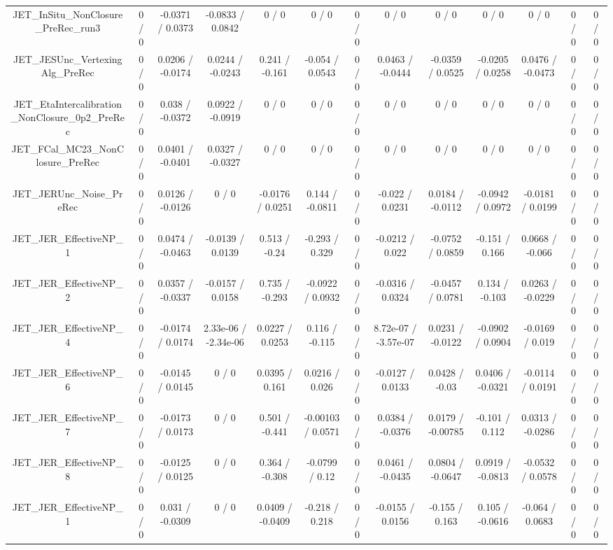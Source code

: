 \documentclass[10pt]{article}
\begin{document}
\begin{table}[htbp]
\begin{center}
\begin{tabular}{|c|c|c|c|c|c|c|c|c|c|c|c|c|}
  JET_InSitu_NonClosure_PreRec_run3 & 0 / 0 & -0.0371 / 0.0373 & -0.0833 / 0.0842 & 0 / 0 & 0 / 0 & 0 / 0 & 0 / 0 & 0 / 0 & 0 / 0 & 0 / 0 & 0 / 0 & 0 / 0 \\ 
  JET_JESUnc_VertexingAlg_PreRec & 0 / 0 & 0.0206 / -0.0174 & 0.0244 / -0.0243 & 0.241 / -0.161 & -0.054 / 0.0543 & 0 / 0 & 0.0463 / -0.0444 & -0.0359 / 0.0525 & -0.0205 / 0.0258 & 0.0476 / -0.0473 & 0 / 0 & 0 / 0 \\ 
  JET_EtaIntercalibration_NonClosure_0p2_PreRec & 0 / 0 & 0.038 / -0.0372 & 0.0922 / -0.0919 & 0 / 0 & 0 / 0 & 0 / 0 & 0 / 0 & 0 / 0 & 0 / 0 & 0 / 0 & 0 / 0 & 0 / 0 \\ 
  JET_FCal_MC23_NonClosure_PreRec & 0 / 0 & 0.0401 / -0.0401 & 0.0327 / -0.0327 & 0 / 0 & 0 / 0 & 0 / 0 & 0 / 0 & 0 / 0 & 0 / 0 & 0 / 0 & 0 / 0 & 0 / 0 \\ 
  JET_JERUnc_Noise_PreRec & 0 / 0 & 0.0126 / -0.0126 & 0 / 0 & -0.0176 / 0.0251 & 0.144 / -0.0811 & 0 / 0 & -0.022 / 0.0231 & 0.0184 / -0.0112 & -0.0942 / 0.0972 & -0.0181 / 0.0199 & 0 / 0 & 0 / 0 \\ 
  JET_JER_EffectiveNP_1 & 0 / 0 & 0.0474 / -0.0463 & -0.0139 / 0.0139 & 0.513 / -0.24 & -0.293 / 0.329 & 0 / 0 & -0.0212 / 0.022 & -0.0752 / 0.0859 & -0.151 / 0.166 & 0.0668 / -0.066 & 0 / 0 & 0 / 0 \\ 
  JET_JER_EffectiveNP_2 & 0 / 0 & 0.0357 / -0.0337 & -0.0157 / 0.0158 & 0.735 / -0.293 & -0.0922 / 0.0932 & 0 / 0 & -0.0316 / 0.0324 & -0.0457 / 0.0781 & 0.134 / -0.103 & 0.0263 / -0.0229 & 0 / 0 & 0 / 0 \\ 
  JET_JER_EffectiveNP_4 & 0 / 0 & -0.0174 / 0.0174 & 2.33e-06 / -2.34e-06 & 0.0227 / 0.0253 & 0.116 / -0.115 & 0 / 0 & 8.72e-07 / -3.57e-07 & 0.0231 / -0.0122 & -0.0902 / 0.0904 & -0.0169 / 0.019 & 0 / 0 & 0 / 0 \\ 
  JET_JER_EffectiveNP_6 & 0 / 0 & -0.0145 / 0.0145 & 0 / 0 & 0.0395 / 0.161 & 0.0216 / 0.026 & 0 / 0 & -0.0127 / 0.0133 & 0.0428 / -0.03 & 0.0406 / -0.0321 & -0.0114 / 0.0191 & 0 / 0 & 0 / 0 \\ 
  JET_JER_EffectiveNP_7 & 0 / 0 & -0.0173 / 0.0173 & 0 / 0 & 0.501 / -0.441 & -0.00103 / 0.0571 & 0 / 0 & 0.0384 / -0.0376 & 0.0179 / -0.00785 & -0.101 / 0.112 & 0.0313 / -0.0286 & 0 / 0 & 0 / 0 \\ 
  JET_JER_EffectiveNP_8 & 0 / 0 & -0.0125 / 0.0125 & 0 / 0 & 0.364 / -0.308 & -0.0799 / 0.12 & 0 / 0 & 0.0461 / -0.0435 & 0.0804 / -0.0647 & 0.0919 / -0.0813 & -0.0532 / 0.0578 & 0 / 0 & 0 / 0 \\ 
  JET_JER_EffectiveNP_1 & 0 / 0 & 0.031 / -0.0309 & 0 / 0 & 0.0409 / -0.0409 & -0.218 / 0.218 & 0 / 0 & -0.0155 / 0.0156 & -0.155 / 0.163 & 0.105 / -0.0616 & -0.064 / 0.0683 & 0 / 0 & 0 / 0 \\ 

\end{tabular}
\end{center}
\end{table}
\end{document}
